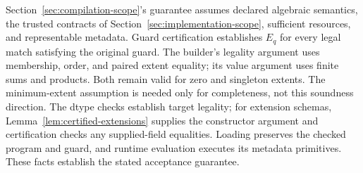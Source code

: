 Section~\ref{sec:compilation-scope}'s guarantee assumes declared algebraic
semantics, the trusted contracts of Section~\ref{sec:implementation-scope},
sufficient resources, and representable metadata. Guard certification
establishes $E_q$ for every legal match satisfying the original guard.
The builder's legality argument uses membership, order, and paired extent
equality; its value argument uses finite sums and products. Both remain
valid for zero and singleton extents. The minimum-extent assumption is
needed only for completeness, not this soundness direction.
The dtype checks establish target legality; for extension schemas,
Lemma~\ref{lem:certified-extensions} supplies the constructor argument and
certification checks any supplied-field equalities. Loading preserves the
checked program and guard, and runtime evaluation executes its metadata
primitives. These facts establish the stated acceptance guarantee.
